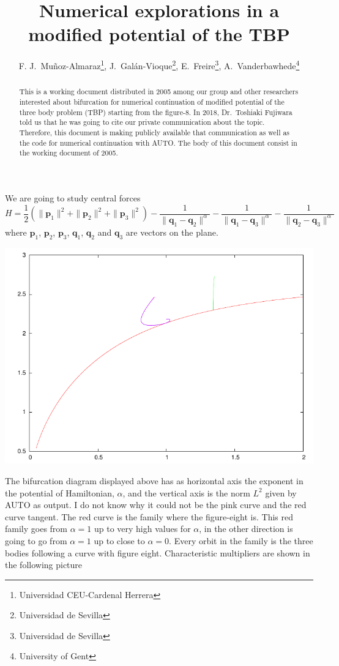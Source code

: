 \documentclass{article}
\title{Numerical explorations in a modified potential of the TBP}
\author{F. J.~Mu\~noz-Almaraz\footnote{Universidad CEU-Cardenal
    Herrera}, J.~Gal\'an-Vioque\footnote{Universidad de Sevilla}, E.~Freire\footnote{Universidad de Sevilla},
  A.~Vanderbawhede\footnote{University of Gent}}
\begin{document}
\maketitle
\begin{abstract}
  This is a working document distributed in 2005 among our group and other
  researchers interested about bifurcation for numerical continuation
  of modified potential of the three body problem (TBP) starting from
  the figure-8. In 2018, Dr.~Toshiaki Fujiwara told us that he was
  going to cite our private communication about the topic. Therefore,
 this document is making publicly available that communication as well
 as the code for numerical continuation  with AUTO. The body of this
 document consist in the working document of 2005. 
\end{abstract}
We are going to study central forces 
\begin{equation}
H=\frac 1 2 (\| \mathbf{p}_1\|^2 +\| \mathbf{p}_2\|^2+ \| \mathbf{p}_3\|^2) - \frac 1 {\|  \mathbf{q}_1-\mathbf{q}_2\|^{\alpha}}
-\frac 1 {\|  \mathbf{q}_1-\mathbf{q}_3\|^{\alpha}}-\frac 1 {\|  \mathbf{q}_2-\mathbf{q}_3\|^{\alpha}}
\end{equation}
where $\mathbf{p}_1$, $\mathbf{p}_2$, $\mathbf{p}_3$, $\mathbf{q}_1$, $\mathbf{q}_2$ and  $\mathbf{q}_3$ 
are vectors on the plane.
  
\includegraphics{bd.pdf}

The bifurcation diagram displayed above has as horizontal axis the exponent in the potential of Hamiltonian, $\alpha$, 
and the vertical axis is the norm $L^2$ given by AUTO as output. I do not know why it could not be the pink curve and  the red curve tangent.
The red curve is the family where the figure-eight is. This red family goes from $\alpha=1$ up to very high values for $\alpha$, in the other 
direction is going to go from $\alpha=1$ up to close to $\alpha=0$. Every orbit in the family is the three bodies following a curve with figure eight. 
Characteristic multipliers are shown in the following picture 
\end{document}
